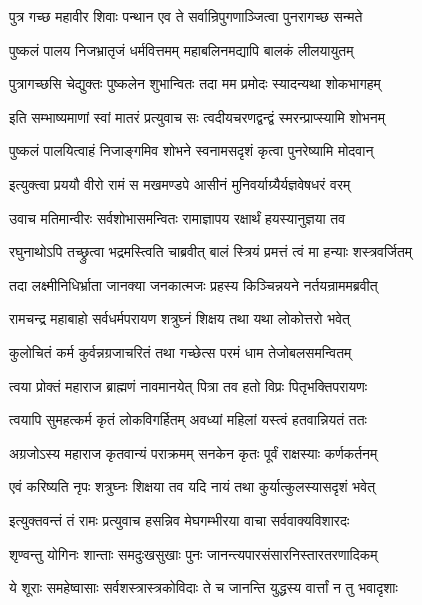 
\twolineshloka
{पुत्र गच्छ महावीर शिवाः पन्थान एव ते}
{सर्वान्रिपुगणाञ्जित्वा पुनरागच्छ सन्मते}%

\twolineshloka
{पुष्कलं पालय निजभ्रातृजं धर्मवित्तमम्}
{महाबलिनमद्यापि बालकं लीलयायुतम्}%

\twolineshloka
{पुत्रागच्छसि चेद्युक्तः पुष्कलेन शुभान्वितः}
{तदा मम प्रमोदः स्यादन्यथा शोकभागहम्}%

\twolineshloka
{इति सम्भाष्यमाणां स्वां मातरं प्रत्युवाच सः}
{त्वदीयचरणद्वन्द्वं स्मरन्प्राप्स्यामि शोभनम्}%

\twolineshloka
{पुष्कलं पालयित्वाहं निजाङ्गमिव शोभने}
{स्वनामसदृशं कृत्वा पुनरेष्यामि मोदवान्}%

\twolineshloka
{इत्युक्त्वा प्रययौ वीरो रामं स मखमण्डपे}
{आसीनं मुनिवर्याग्र्यैर्यज्ञवेषधरं वरम्}%

\twolineshloka
{उवाच मतिमान्वीरः सर्वशोभासमन्वितः}
{रामाज्ञापय रक्षार्थं हयस्यानुज्ञया तव}%

\twolineshloka
{रघुनाथोऽपि तच्छ्रुत्वा भद्रमस्त्विति चाब्रवीत्}
{बालं स्त्रियं प्रमत्तं त्वं मा हन्याः शस्त्रवर्जितम्}%

\twolineshloka
{तदा लक्ष्मीनिधिर्भ्राता जानक्या जनकात्मजः}
{प्रहस्य किञ्चिन्नयने नर्तयन्राममब्रवीत्}%


\twolineshloka
{रामचन्द्र महाबाहो सर्वधर्मपरायण}
{शत्रुघ्नं शिक्षय तथा यथा लोकोत्तरो भवेत्}%

\twolineshloka
{कुलोचितं कर्म कुर्वन्नग्रजाचरितं तथा}
{गच्छेत्स परमं धाम तेजोबलसमन्वितम्}%

\twolineshloka
{त्वया प्रोक्तं महाराज ब्राह्मणं नावमानयेत्}
{पित्रा तव हतो विप्रः पितृभक्तिपरायणः}%

\twolineshloka
{त्वयापि सुमहत्कर्म कृतं लोकविगर्हितम्}
{अवध्यां महिलां यस्त्वं हतवान्नियतं ततः}%

\twolineshloka
{अग्रजोऽस्य महाराज कृतवान्यं पराक्रमम्}
{सनकेन कृतः पूर्वं राक्षस्याः कर्णकर्तनम्}%

\twolineshloka
{एवं करिष्यति नृपः शत्रुघ्नः शिक्षया तव}
{यदि नायं तथा कुर्यात्कुलस्यासदृशं भवेत्}%

\twolineshloka
{इत्युक्तवन्तं तं रामः प्रत्युवाच हसन्निव}
{मेघगम्भीरया वाचा सर्ववाक्यविशारदः}%

\twolineshloka
{शृण्वन्तु योगिनः शान्ताः समदुःखसुखाः पुनः}
{जानन्त्यपारसंसारनिस्तारतरणादिकम्}%

\twolineshloka
{ये शूराः समहेष्वासाः सर्वशस्त्रास्त्रकोविदाः}
{ते च जानन्ति युद्धस्य वार्त्तां न तु भवादृशाः}%

